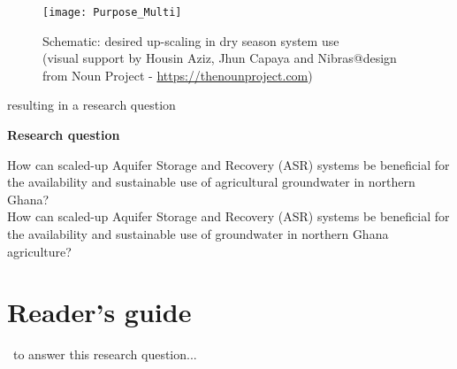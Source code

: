 \begin{figure}[h]
 \centering\texttt{[image: Purpose\_Multi]}
 \captionsetup{justification=centering}
 \caption[Schematic: desired up-scaling in dry season system use]{Schematic: desired up-scaling in dry season system use \\ (visual support by Housin Aziz, Jhun Capaya and Nibras@design from Noun Project - \url{https://thenounproject.com})}
 \label{fig:Purpose_Multi}
\end{figure}

resulting in a research question

\textbf{Research question}\

How can scaled-up Aquifer Storage and Recovery (ASR) systems be beneficial for the availability and sustainable use of agricultural groundwater in northern Ghana? \\

How can scaled-up Aquifer Storage and Recovery (ASR) systems be beneficial for the availability and sustainable use of groundwater in northern Ghana agriculture?

\section{Reader's guide}\
to answer this research question... 
